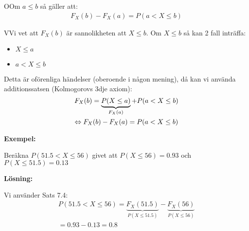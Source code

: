 \par\bigskip
\begin{theo}
  OOm $a\leq b$ så gäller att:
  \begin{equation*}
    \begin{gathered}
      F_X(b) -F_X(a) = P(a< X\leq b)
    \end{gathered}
  \end{equation*}
\end{theo}
\par\bigskip
\begin{prf}
  VVi vet att $F_X(b)$ är sannolikheten att $X\leq b$. Om $X\leq b$ så kan 2 fall inträffa:\par
  \begin{itemize}
    \item $X\leq a$
    \item $a< X\leq b$
  \end{itemize}\par
  \noindent Detta är oförenliga händelser (oberoende i någon mening), då kan vi använda additionssatsen (Kolmogorovs 3dje axiom):
  \begin{equation*}
    \begin{gathered}
      F_X(b) = \underbrace{P(X\leq a)}_{\text{$F_X(a)$}} + P(a< X\leq b)\\
      \Leftrightarrow F_X(b)-F_X(a) = P(a<X\leq b)
    \end{gathered}
  \end{equation*}
\end{prf}
\par\bigskip
\noindent\textbf{Exempel:}\par
\noindent Beräkna $P(51.5<X\leq 56)$ givet att $P(X\leq 56) = 0.93$ och $P(X\leq 51.5) = 0.13$
\par\bigskip
\noindent\textbf{Lösning:}\par
\noindent Vi använder Sats 7.4:
\begin{equation*}
  \begin{gathered}
    P(51.5<X\leq 56) = \underbrace{F_X(51.5)}_{\text{$P(X\leq 51.5)$}} - \underbrace{F_X(56)}_{\text{$P(X\leq 56)$}}\\
    = 0.93-0.13 = 0.8
  \end{gathered}
\end{equation*}
\par\bigskip

